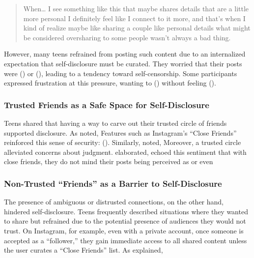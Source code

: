 \blockquote{When\ldots{} I see something like this that maybe shares details that are a little more personal I definitely feel like I connect to it more, and that's when I kind of realize maybe like sharing a couple like personal details what might be considered oversharing to some people wasn't always a bad thing.}{{}}

However, many teens refrained from posting such content due to an internalized expectation that self-disclosure must be curated. They worried that their posts were  () or  (), leading to a tendency toward self-censorship. Some participants expressed frustration at this pressure, wanting to  () without feeling  ().


\subsubsection{\textbf{Trusted Friends as a Safe Space for Self-Disclosure}}
\label{section:4-1-2}
Teens shared that having a way to carve out their trusted circle of friends supported disclosure. As  noted,  Features such as Instagram's ``Close Friends'' reinforced this sense of security:  (). Similarly,  noted,  Moreover, a trusted circle alleviated concerns about judgment.  elaborated,   echoed this sentiment that with close friends, they do not mind their posts being perceived as  or even 

\subsubsection{\textbf{Non-Trusted ``Friends'' as a Barrier to Self-Disclosure}}
\label{section:4-1-3}
The presence of ambiguous or distrusted connections, on the other hand, hindered self-disclosure. Teens frequently described situations where they wanted to share but refrained due to the potential presence of audiences they would not trust. On Instagram, for example, even with a private account, once someone is accepted as a ``follower,'' they gain immediate access to all shared content unless the user curates a ``Close Friends'' list. As  explained, 


